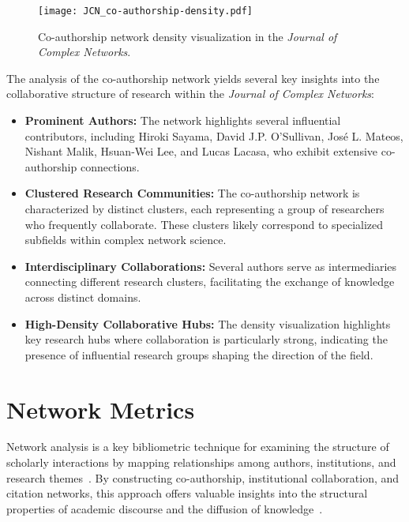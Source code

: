 \documentclass[twocolumn]{article}
\begin{document}
		
		\begin{figure}[htbp]
			\centering
			\texttt{[image: JCN\_co-authorship-density.pdf]}
			\caption{Co-authorship network density visualization in the \textit{Journal of Complex Networks}.}
			\label{fig.fig17}
		\end{figure}
		
		The analysis of the co-authorship network yields several key insights into the collaborative structure of research within the \textit{Journal of Complex Networks}:
		
		\begin{itemize}
			\item \textbf{Prominent Authors:} The network highlights several influential contributors, including Hiroki Sayama, David J.P. O’Sullivan, José L. Mateos, Nishant Malik, Hsuan-Wei Lee, and Lucas Lacasa, who exhibit extensive co-authorship connections.
			\item \textbf{Clustered Research Communities:} The co-authorship network is characterized by distinct clusters, each representing a group of researchers who frequently collaborate. These clusters likely correspond to specialized subfields within complex network science.
			\item \textbf{Interdisciplinary Collaborations:} Several authors serve as intermediaries connecting different research clusters, facilitating the exchange of knowledge across distinct domains.
			\item \textbf{High-Density Collaborative Hubs:} The density visualization highlights key research hubs where collaboration is particularly strong, indicating the presence of influential research groups shaping the direction of the field.
		\end{itemize}
		
		\section{Network Metrics}
		
		Network analysis is a key bibliometric technique for examining the structure of scholarly interactions by mapping relationships among authors, institutions, and research themes~\cite{newman2001scientific, Barabasi2002, Borgatti2009}. By constructing co-authorship, institutional collaboration, and citation networks, this approach offers valuable insights into the structural properties of academic discourse and the diffusion of knowledge~\cite{Otte2002, Liu2005}.
		
\end{document}

